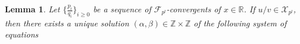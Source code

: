 \documentclass[12pt]{elsarticle}
\newtheorem{lemma}[theorem]{Lemma}
\newtheorem{proposition}[theorem]{Proposition}
\theoremstyle{definition}
\newcommand{\field}[1]{\mathbb{#1}}          \newcommand{\Q}{\field{Q}}
\newcommand{\R}{\field{R}}                   \newcommand{\Z}{\field{Z}}
\newcommand{\mX}{{\mathcal X}}
\newcommand{\f}{{\mathcal F}}
\newcommand{\ep}{\epsilon}
\begin{document}
{%
%  	
%  			
  	\begin{lemma}\label{sandwich}
  		Let $\{\frac{p_i}{q_i}\}_{i\ge0}$ be a  sequence of $\f_{p^l}$-convergents of $x\in\R$. If $u/v\in\mX_{p^l}$, then 
  		there exists a unique
  		solution $(\alpha,\beta)\in\Z\times\Z$ of the following system of equations 

\end{lemma}}
\end{document}
